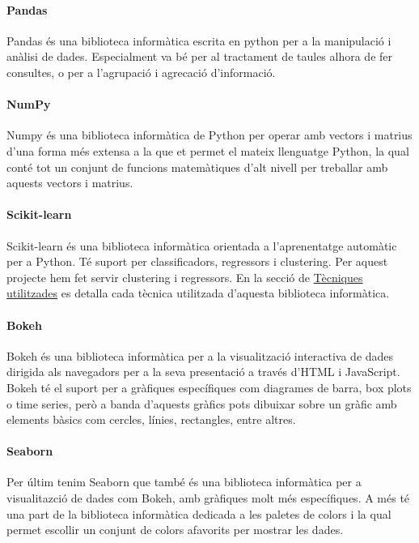 \documentclass[12pt,a4paper,catalan]{article}
\begin{document}
\hypertarget{pandas}{
	\paragraph{Pandas}
}
Pandas és una biblioteca informàtica escrita en python per a la manipulació i anàlisi de dades. Especialment va bé per al tractament de taules alhora de fer consultes, o per a l'agrupació i agrecació d'informació.

\hypertarget{numpy}{
	\paragraph{NumPy}
}
Numpy és una biblioteca informàtica de Python per operar amb vectors i matrius d'una forma més extensa a la que et permet el mateix llenguatge Python, la qual conté tot un conjunt de funcions matemàtiques d'alt nivell per treballar amb aquests vectors i matrius.

\hypertarget{sklearn}{
	\paragraph{Scikit-learn}
}
Scikit-learn és una biblioteca informàtica orientada a l'aprenentatge automàtic per a Python. Té suport per classificadors, regressors i clustering. Per aquest projecte hem fet servir clustering i regressors. En la secció de \hyperlink{tecniquesutilitzades}{Tècniques utilitzades} es detalla cada tècnica utilitzada d'aquesta biblioteca informàtica.

\paragraph{Bokeh}
Bokeh és una biblioteca informàtica per a la visualització interactiva de dades dirigida als navegadors per a la seva presentació a través d'HTML i JavaScript. Bokeh té el suport per a gràfiques específiques com diagrames de barra, box plots o time series, però a banda d'aquests gràfics pots dibuixar sobre un gràfic amb elements bàsics com cercles, línies, rectangles, entre altres.

\paragraph{Seaborn}
Per últim tenim Seaborn que també és una biblioteca informàtica per a visualitazció de dades com Bokeh, amb gràfiques molt més específiques. A més té una part de la biblioteca informàtica dedicada a les paletes de colors i la qual permet escollir un conjunt de colors afavorits per mostrar les dades.
\end{document}
